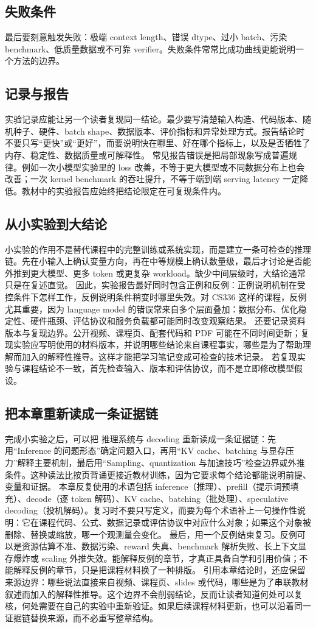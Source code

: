 \documentclass[a4paper]{article}
\begin{document}
\subsection{失败条件}
最后要刻意触发失败：极端 context length、错误 dtype、过小 batch、污染 benchmark、低质量数据或不可靠 verifier。失败条件常常比成功曲线更能说明一个方法的边界。
\subsection{记录与报告}
实验记录应能让另一个读者复现同一结论。最少要写清楚输入构造、代码版本、随机种子、硬件、batch shape、数据版本、评价指标和异常处理方式。报告结论时不要只写“更快”或“更好”，而要说明快在哪里、好在哪个指标上，以及是否牺牲了内存、稳定性、数据质量或可解释性。
常见报告错误是把局部现象写成普遍规律。例如一次小模型实验里的 loss 改善，不等于更大模型或不同数据分布上也会改善；一次 kernel benchmark 的吞吐提升，不等于端到端 serving latency 一定降低。教材中的实验报告应始终把结论限定在可复现条件内。
\subsection{从小实验到大结论}
小实验的作用不是替代课程中的完整训练或系统实现，而是建立一条可检查的推理链。先在小输入上确认变量方向，再在中等规模上确认数量级，最后才讨论是否能外推到更大模型、更多 token 或更复杂 workload。缺少中间层级时，大结论通常只是在复述直觉。
因此，实验报告最好同时包含正例和反例：正例说明机制在受控条件下怎样工作，反例说明条件稍变时哪里失效。对 CS336 这样的课程，反例尤其重要，因为 language model 的错误常来自多个层面叠加：数据分布、优化稳定性、硬件瓶颈、评估协议和服务负载都可能同时改变观察结果。
还要记录资料版本与复现边界。公开视频、课程页、配套代码和 PDF 可能在不同时间更新；复现实验应写明使用的材料版本，并说明哪些结论来自课程事实，哪些是为了帮助理解而加入的解释性推导。这样才能把学习笔记变成可检查的技术记录。
若复现实验与课程结论不一致，首先检查输入、版本和评估协议，而不是立即修改模型假设。
\subsection{把本章重新读成一条证据链}
完成小实验之后，可以把 推理系统与 decoding 重新读成一条证据链：先用“Inference 的问题形态”确定问题入口，再用“KV cache、batching 与显存压力”解释主要机制，最后用“Sampling、quantization 与加速技巧”检查边界或外推条件。这种读法比按页背诵更接近教材训练，因为它要求每个结论都能说明前提、变量和证据。
本章反复使用的术语包括 inference（推理）、prefill（提示词预填充）、decode（逐 token 解码）、KV cache、batching（批处理）、speculative decoding（投机解码）。复习时不要只写定义，而要为每个术语补上一句操作性说明：它在课程代码、公式、数据记录或评估协议中对应什么对象；如果这个对象被删除、替换或缩放，哪一个观测量会变化。
最后，用一个反例结束复习。反例可以是资源估算不准、数据污染、reward 失真、benchmark 解析失败、长上下文显存爆炸或 scaling 外推失效。能解释反例的章节，才真正具备自学和引用价值；不能解释反例的章节，只是把课程材料换了一种排版。
引用本章结论时，还应保留来源边界：哪些说法直接来自视频、课程页、slides 或代码，哪些是为了串联教材叙述而加入的解释性推导。这个边界不会削弱结论，反而让读者知道何处可以复核，何处需要在自己的实验中重新验证。如果后续课程材料更新，也可以沿着同一证据链替换来源，而不必重写整章结构。
\end{document}
